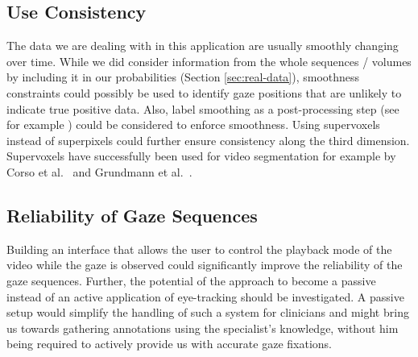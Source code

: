 \subsection{Use Consistency}
The data we are dealing with in this application are usually smoothly changing over time.
While we did consider information from the whole sequences / volumes by including it in our probabilities (Section \ref{sec:real-data}), smoothness constraints could possibly be used to identify gaze positions that are unlikely to indicate true positive data. Also, label smoothing as a post-processing step (see for example \cite{zhou2004learning}) could be considered to enforce smoothness.
Using supervoxels instead of superpixels could further ensure consistency along the third dimension. Supervoxels have successfully been used for video segmentation for example by Corso et al.\ \cite{CoShDuTMI2008} and Grundmann et al.\ \cite{grundmann2010efficient}.

\subsection{Reliability of Gaze Sequences}
Building an interface that allows the user to control the playback mode of the video while the gaze is observed could significantly improve the reliability of the gaze sequences. 
Further, the potential of the approach to become a passive instead of an active application of eye-tracking should be investigated. 
A passive setup would simplify the handling of such a system for clinicians and might bring us towards gathering annotations using the specialist's knowledge, without him being required to actively provide us with accurate gaze fixations.